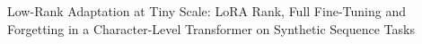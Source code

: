 Low-Rank Adaptation at Tiny Scale: LoRA Rank, Full Fine-Tuning and Forgetting in a Character-Level Transformer on Synthetic Sequence Tasks
